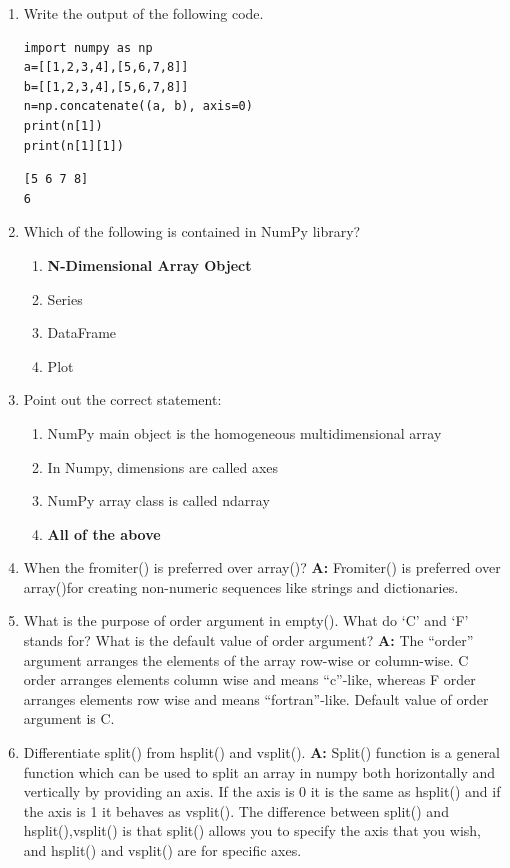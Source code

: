 \documentclass[11pt]{article}
\begin{document}
\begin{enumerate}
\item Write the output of the following code.
\begin{verbatim}
import numpy as np
a=[[1,2,3,4],[5,6,7,8]]
b=[[1,2,3,4],[5,6,7,8]]
n=np.concatenate((a, b), axis=0)
print(n[1])
print(n[1][1])
\end{verbatim}

\begin{verbatim}
[5 6 7 8]
6
\end{verbatim}

\item Which of the following is contained in NumPy library?
\begin{enumerate}
\item \textbf{N-Dimensional Array Object}
\item Series
\item DataFrame
\item Plot
\end{enumerate}

\item Point out the correct statement:
\begin{enumerate}
\item NumPy main object is the homogeneous multidimensional array
\item In Numpy, dimensions are called axes
\item NumPy array class is called ndarray
\item \textbf{All of the above}
\end{enumerate}

\item When the fromiter() is preferred over array()?
\textbf{A:} Fromiter() is preferred over array()for creating non-numeric
sequences like strings and dictionaries.

\item What is the purpose of order argument in empty(). What do ‘C’
and ‘F’ stands for? What is the default value of order
argument?
\textbf{A:} The “order” argument arranges the elements of the
array row-wise or column-wise. C order arranges elements column
wise and means “c”-like, whereas F order arranges elements row
wise and means “fortran”-like. Default value of order argument
is C.

\item Differentiate split() from hsplit() and vsplit().
\textbf{A:} Split() function is a general function which can be used to split an
array in numpy both horizontally and vertically by providing an
axis. If the axis is 0 it is the same as hsplit() and if the
axis is 1 it behaves as vsplit(). The difference between
split() and hsplit(),vsplit() is that split() allows you to
specify the axis that you wish, and hsplit() and vsplit() are
for specific axes.


\end{enumerate}
\end{document}
